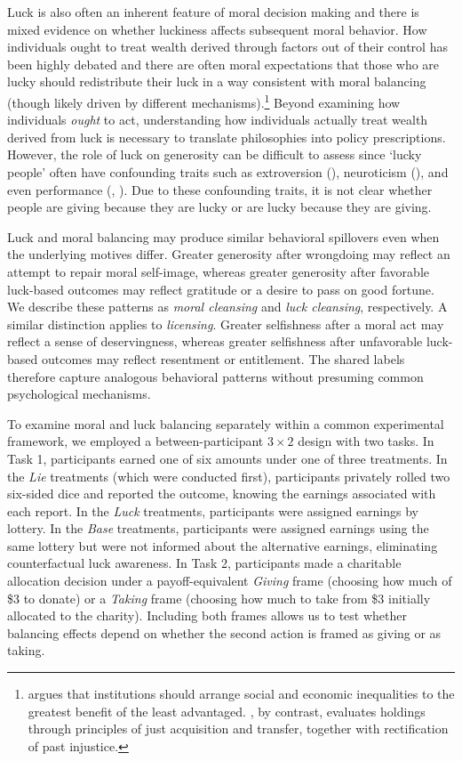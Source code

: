 \documentclass{article}
\begin{document}
\par
Luck is also often an inherent feature of moral decision making and there is mixed evidence on whether luckiness affects subsequent moral behavior. How individuals ought to treat wealth derived through factors out of their control has been highly debated and there are often moral expectations that those who are lucky should redistribute their luck in a way consistent with moral balancing (though likely driven by different mechanisms).\footnote{\textcite{Rawls1971} argues that institutions should arrange social and economic inequalities to the greatest benefit of the least advantaged. \textcite{Nozick1974}, by contrast, evaluates holdings through principles of just acquisition and transfer, together with rectification of past injustice.} Beyond examining how individuals \textit{ought} to act, understanding how individuals actually treat wealth derived from luck is necessary to translate philosophies into policy prescriptions. However, the role of luck on generosity can be difficult to assess since `lucky people' often have confounding traits such as extroversion (\cite{Wiseman2011}), neuroticism (\cite{Thompson2022}), and even performance (\cite{Damisch2010}, \cite{Churchill2015}). Due to these confounding traits, it is not clear whether people are giving because they are lucky or are lucky because they are giving.
\par
Luck and moral balancing may produce similar behavioral spillovers even when the underlying motives differ. Greater generosity after wrongdoing may reflect an attempt to repair moral self-image, whereas greater generosity after favorable luck-based outcomes may reflect gratitude or a desire to pass on good fortune. We describe these patterns as \textit{moral cleansing} and \textit{luck cleansing}, respectively. A similar distinction applies to \textit{licensing}. Greater selfishness after a moral act may reflect a sense of deservingness, whereas greater selfishness after unfavorable luck-based outcomes may reflect resentment or entitlement. The shared labels therefore capture analogous behavioral patterns without presuming common psychological mechanisms.
\par
To examine moral and luck balancing separately within a common experimental framework, we employed a between-participant $3\times2$ design with two tasks. In Task 1, participants earned one of six amounts under one of three treatments. In the \textit{Lie} treatments (which were conducted first), participants privately rolled two six-sided dice and reported the outcome, knowing the earnings associated with each report. In the \textit{Luck} treatments, participants were assigned earnings by lottery. In the \textit{Base} treatments, participants were assigned earnings using the same lottery but were not informed about the alternative earnings, eliminating counterfactual luck awareness. In Task 2, participants made a charitable allocation decision under a payoff-equivalent \textit{Giving} frame (choosing how much of \$3 to donate) or a \textit{Taking} frame (choosing how much to take from \$3 initially allocated to the charity). Including both frames allows us to test whether balancing effects depend on whether the second action is framed as giving or as taking.
\end{document}
